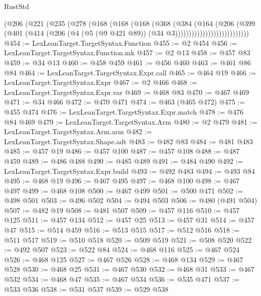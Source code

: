 \begin{lexlean}{RustStd}
\begin{coremodule}
{\begin{coremodule}
{{{{{{{{{{{{{{{{{{{{{{{{{{{{{{{{{                        (@206
                          (@221
                            (@235
                              (@278
                                (@168
                                  (@168
                                    (@168
                                      (@368
                                        (@384
                                          (@164
                                            (@206
                                              (@399
                                                (@401
                                                  (@414
                                                    (@206
                                                      (@4
                                                        (@5 (@9 @421 @89))
                                                        (@34 @3)))))))))))))))))))))))))))
@454 := LexLeanTarget.TargetSyntax.Function
@455 := @2 @454
@456 := LexLeanTarget.TargetSyntax.Function.mk
@457 := @2 @13
@458 := @457 @83
@459 := @34 @13
@460 := @458 @459
@461 := @456 @460
@463 := @461 @86 @84
@464 := LexLeanTarget.TargetSyntax.Expr.call
@465 := @464 @19
@466 := LexLeanTarget.TargetSyntax.Expr
@467 := @2 @466
@468 := LexLeanTarget.TargetSyntax.Expr.var
@469 := @468 @83
@470 := @467 @469
@471 := @34 @466
@472 := @470 @471
@474 := @463 (@465 @472)
@475 := @455 @474
@476 := LexLeanTarget.TargetSyntax.Expr.match
@478 := @476 @84 @469
@479 := LexLeanTarget.TargetSyntax.Arm
@480 := @2 @479
@481 := LexLeanTarget.TargetSyntax.Arm.arm
@482 := LexLeanTarget.TargetSyntax.Shape.adt
@483 := @482 @83
@484 := @481 @483
@485 := @457 @19
@486 := @457 @100
@487 := @457 @108
@488 := @487 @459
@489 := @486 @488
@490 := @485 @489
@491 := @484 @490
@492 := LexLeanTarget.TargetSyntax.Expr.build
@493 := @492 @483
@494 := @493 @84
@495 := @468 @19
@496 := @467 @495
@497 := @468 @100
@498 := @467 @497
@499 := @468 @108
@500 := @467 @499
@501 := @500 @471
@502 := @498 @501
@503 := @496 @502
@504 := @494 @503
@506 := @480 (@491 @504)
@507 := @482 @19
@508 := @481 @507
@509 := @457 @116
@510 := @457 @125
@511 := @457 @134
@512 := @457 @25
@513 := @457 @31
@514 := @457 @47
@515 := @514 @459
@516 := @513 @515
@517 := @512 @516
@518 := @511 @517
@519 := @510 @518
@520 := @509 @519
@521 := @508 @520
@522 := @492 @507
@523 := @522 @84
@524 := @468 @116
@525 := @467 @524
@526 := @468 @125
@527 := @467 @526
@528 := @468 @134
@529 := @467 @528
@530 := @468 @25
@531 := @467 @530
@532 := @468 @31
@533 := @467 @532
@534 := @468 @47
@535 := @467 @534
@536 := @535 @471
@537 := @533 @536
@538 := @531 @537
@539 := @529 @538
}}}}}}}}}}}}}}}}}}}}}}}}}}}}}}}}}
\end{coremodule}}
\end{coremodule}
\end{lexlean}
